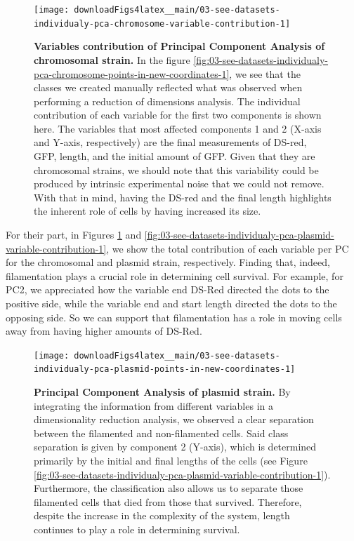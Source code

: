 \documentclass[a4paper, nobind]{templates/ociamthesis}
\begin{document}
\begin{figure}[H]
\texttt{[image: downloadFigs4latex\_\_main/03-see-datasets-individualy-pca-chromosome-variable-contribution-1]} \caption[Variables contribution of Principal Component Analysis of chromosomal strain.]{\textbf{Variables contribution of Principal Component Analysis of chromosomal strain.} In the figure \ref{fig:03-see-datasets-individualy-pca-chromosome-points-in-new-coordinates-1}, we see that the classes we created manually reflected what was observed when performing a reduction of dimensions analysis. The individual contribution of each variable for the first two components is shown here. The variables that most affected components 1 and 2 (X-axis and Y-axis, respectively) are the final measurements of DS-red, GFP, length, and the initial amount of GFP. Given that they are chromosomal strains, we should note that this variability could be produced by intrinsic experimental noise that we could not remove. With that in mind, having the DS-red and the final length highlights the inherent role of cells by having increased its size.}\label{fig:03-see-datasets-individualy-pca-chromosome-variable-contribution-1}
\end{figure}

For their part, in Figures \ref{fig:03-see-datasets-individualy-pca-chromosome-variable-contribution-1} and \ref{fig:03-see-datasets-individualy-pca-plasmid-variable-contribution-1}, we show the total contribution of each variable per PC for the chromosomal and plasmid strain, respectively.
Finding that, indeed, filamentation plays a crucial role in determining cell survival.
For example, for PC2, we appreciated how the variable end DS-Red directed the dots to the positive side, while the variable end and start length directed the dots to the opposing side.
So we can support that filamentation has a role in moving cells away from having higher amounts of DS-Red.





\begin{figure}[H]
\texttt{[image: downloadFigs4latex\_\_main/03-see-datasets-individualy-pca-plasmid-points-in-new-coordinates-1]} \caption[Principal Component Analysis of plasmid strain.]{\textbf{Principal Component Analysis of plasmid strain.} By integrating the information from different variables in a dimensionality reduction analysis, we observed a clear separation between the filamented and non-filamented cells. Said class separation is given by component 2 (Y-axis), which is determined primarily by the initial and final lengths of the cells (see Figure \ref{fig:03-see-datasets-individualy-pca-plasmid-variable-contribution-1}). Furthermore, the classification also allows us to separate those filamented cells that died from those that survived. Therefore, despite the increase in the complexity of the system, length continues to play a role in determining survival.}\label{fig:03-see-datasets-individualy-pca-plasmid-points-in-new-coordinates-1}
\end{figure}
\end{document}
